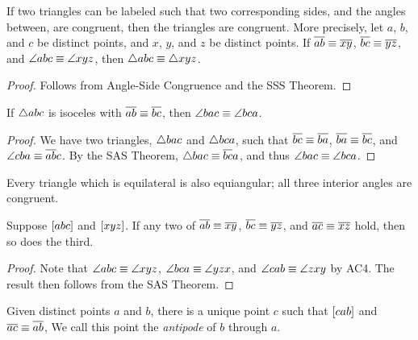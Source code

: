 \begin{prop}
If two triangles can be labeled such that two corresponding sides, and the angles between, are congruent, then the triangles are congruent.
More precisely, let \(a\), \(b\), and \(c\) be distinct points, and \(x\), \(y\), and \(z\) be distinct points.
If \(\overline{ab} \equiv \overline{xy}\), \(\overline{bc} \equiv \overline{yz}\), and \(\angle{abc} \equiv \angle{xyz}\), then \(\bigtriangleup{abc} \equiv \bigtriangleup{xyz}\).
\end{prop}

\begin{proof}
Follows from Angle-Side Congruence and the SSS Theorem.
\end{proof}

\begin{cor}
If \(\bigtriangleup{abc}\) is isoceles with \(\overline{ab} \equiv \overline{bc}\), then \(\angle{bac} \equiv \angle{bca}\).
\end{cor}

\begin{proof}
We have two triangles, \(\bigtriangleup{bac}\) and \(\bigtriangleup{bca}\), such that \(\overline{bc}\equiv \overline{ba}\), \(\overline{ba} \equiv \overline{bc}\), and \(\angle{cba} \equiv \overline{ab}{c}\).
By the SAS Theorem, \(\bigtriangleup{bac} \equiv \overline{bc}{a}\), and thus \(\angle{bac} \equiv \angle{bca}\).
\end{proof}

\begin{cor}
Every triangle which is equilateral is also equiangular; all three interior angles are congruent.
\end{cor}

\begin{cor}
Suppose \([ a b c ]\) and \([ x y z ]\).
If any two of \(\overline{ab} \equiv \overline{xy}\), \(\overline{bc} \equiv \overline{yz}\), and \(\overline{ac} \equiv \overline{xz}\) hold, then so does the third.
\end{cor}

\begin{proof}
Note that \(\angle{abc} \equiv \angle{xyz}\), \(\angle{bca} \equiv \angle{yzx}\), and \(\angle{cab} \equiv \angle{zxy}\) by AC4.
The result then follows from the SAS Theorem.
\end{proof}

\begin{construct}
Given distinct points \(a\) and \(b\), there is a unique point \(c\) such that \([ c a b ]\) and \(\overline{ac} \equiv \overline{ab}\),
We call this point the \emph{antipode} of \(b\) through \(a\).
\end{construct}

